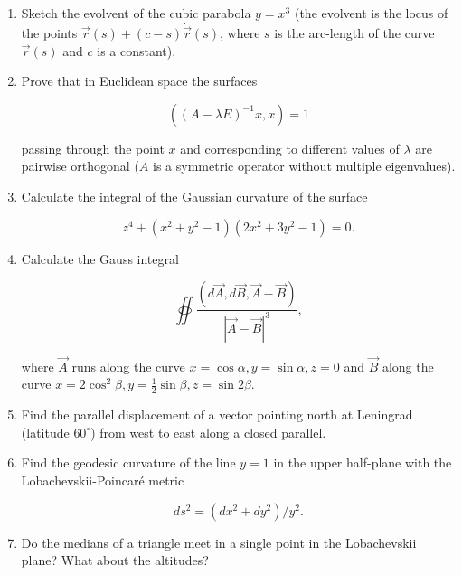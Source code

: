 \documentclass{article}
\begin{document}
\begin{enumerate}
\item Sketch the evolvent of the cubic parabola $y = x^3$ (the evolvent is the
  locus of the points $\vec{r}(s) + (c-s)\dot{\vec{r}}(s)$, where $s$ is the
  arc-length of the curve $\vec{r}(s)$ and $c$ is a constant).

\item Prove that in Euclidean space the surfaces

  \begin{equation*}
    ((A - \lambda E)^{-1} x, x) = 1
  \end{equation*}

  passing through the point $x$ and corresponding to different values of
  $\lambda$ are pairwise orthogonal ($A$ is a symmetric operator without
  multiple eigenvalues).

\item Calculate the integral of the Gaussian curvature of the surface

  \begin{equation*}
    z^4 + (x^2 + y^2 - 1)(2x^2 + 3y^2 - 1) = 0 .
  \end{equation*}

\item Calculate the Gauss integral

  \begin{equation*}
    \oiint \frac{\left( d\vec{A}, d\vec{B}, \vec{A} - \vec{B} \right)}{\left| \vec{A} - \vec{B} \right|^3},
  \end{equation*}

  where $\vec{A}$ runs along the curve $x = \cos \alpha, y = \sin \alpha, z = 0$
  and $\vec{B}$ along the curve
  $x = 2 \cos^2 \beta, y = \frac{1}{2}\sin\beta, z = \sin 2\beta$.

\item Find the parallel displacement of a vector pointing north at Leningrad
  (latitude $60^\circ$) from west to east along a closed parallel.

\item Find the geodesic curvature of the line $y = 1$ in the upper half-plane with the Lobachevskii-Poincar\'e metric

  \begin{equation*}
    ds^2 = (dx^2 + dy^2)/y^2 .
  \end{equation*}

\item Do the medians of a triangle meet in a single point in the Lobachevskii plane? What about the altitudes?


\end{enumerate}
\end{document}
